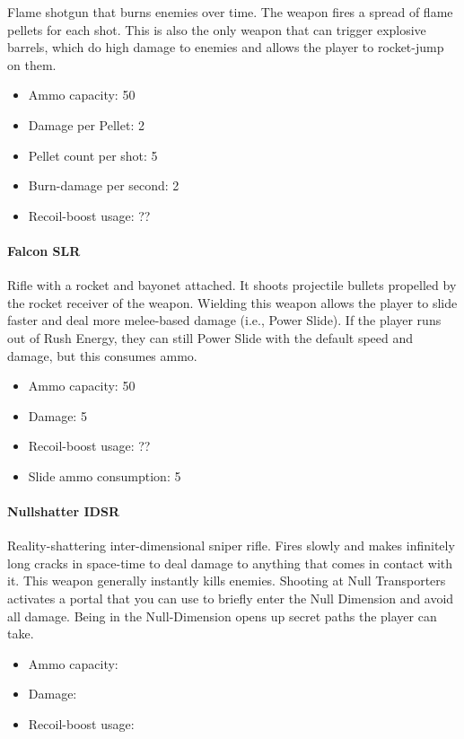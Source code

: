 \documentclass[12pt]{article}
\begin{document}
Flame shotgun that burns enemies over time. The weapon fires a spread of flame pellets for each shot. This is also the only weapon that can trigger explosive barrels, which do high damage to enemies and allows the player to rocket-jump on them. 

\begin{itemize}
	\item Ammo capacity: 50
	\item Damage per Pellet: 2
	\item Pellet count per shot: 5
	\item Burn-damage per second: 2
	\item Recoil-boost usage: ??
\end{itemize} 

\paragraph{Falcon SLR}

Rifle with a rocket and bayonet attached. It shoots projectile bullets propelled by the rocket receiver of the weapon. Wielding this weapon allows the player to slide faster and deal more melee-based damage (i.e., Power Slide). If the player runs out of Rush Energy, they can still Power Slide with the default speed and damage, but this consumes ammo. 

\begin{itemize}
	\item Ammo capacity: 50
	\item Damage: 5
	\item Recoil-boost usage: ??
	\item Slide ammo consumption: 5
\end{itemize} 


\paragraph{Nullshatter IDSR}

Reality-shattering inter-dimensional sniper rifle. Fires slowly and makes infinitely long cracks in space-time to deal damage to anything that comes in contact with it. This weapon generally instantly kills enemies. Shooting at Null Transporters activates a portal that you can use to briefly enter the Null Dimension and avoid all damage. Being in the Null-Dimension opens up secret paths the player can take.

\begin{itemize}
	\item Ammo capacity: 
	\item Damage: 
	\item Recoil-boost usage:
\end{itemize}
\end{document}
